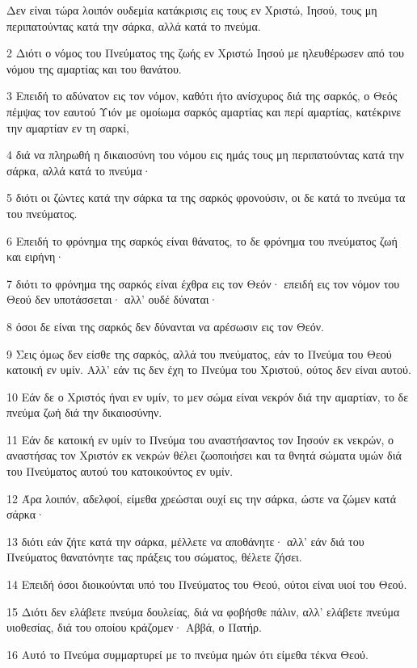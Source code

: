 \par Δεν είναι τώρα λοιπόν ουδεμία κατάκρισις εις τους εν Χριστώ, Ιησού, τους μη περιπατούντας κατά την σάρκα, αλλά κατά το πνεύμα.
\par 2 Διότι ο νόμος του Πνεύματος της ζωής εν Χριστώ Ιησού με ηλευθέρωσεν από του νόμου της αμαρτίας και του θανάτου.
\par 3 Επειδή το αδύνατον εις τον νόμον, καθότι ήτο ανίσχυρος διά της σαρκός, ο Θεός πέμψας τον εαυτού Υιόν με ομοίωμα σαρκός αμαρτίας και περί αμαρτίας, κατέκρινε την αμαρτίαν εν τη σαρκί,
\par 4 διά να πληρωθή η δικαιοσύνη του νόμου εις ημάς τους μη περιπατούντας κατά την σάρκα, αλλά κατά το πνεύμα·
\par 5 διότι οι ζώντες κατά την σάρκα τα της σαρκός φρονούσιν, οι δε κατά το πνεύμα τα του πνεύματος.
\par 6 Επειδή το φρόνημα της σαρκός είναι θάνατος, το δε φρόνημα του πνεύματος ζωή και ειρήνη·
\par 7 διότι το φρόνημα της σαρκός είναι έχθρα εις τον Θεόν· επειδή εις τον νόμον του Θεού δεν υποτάσσεται· αλλ' ουδέ δύναται·
\par 8 όσοι δε είναι της σαρκός δεν δύνανται να αρέσωσιν εις τον Θεόν.
\par 9 Σεις όμως δεν είσθε της σαρκός, αλλά του πνεύματος, εάν το Πνεύμα του Θεού κατοική εν υμίν. Αλλ' εάν τις δεν έχη το Πνεύμα του Χριστού, ούτος δεν είναι αυτού.
\par 10 Εάν δε ο Χριστός ήναι εν υμίν, το μεν σώμα είναι νεκρόν διά την αμαρτίαν, το δε πνεύμα ζωή διά την δικαιοσύνην.
\par 11 Εάν δε κατοική εν υμίν το Πνεύμα του αναστήσαντος τον Ιησούν εκ νεκρών, ο αναστήσας τον Χριστόν εκ νεκρών θέλει ζωοποιήσει και τα θνητά σώματα υμών διά του Πνεύματος αυτού του κατοικούντος εν υμίν.
\par 12 Άρα λοιπόν, αδελφοί, είμεθα χρεώσται ουχί εις την σάρκα, ώστε να ζώμεν κατά σάρκα·
\par 13 διότι εάν ζήτε κατά την σάρκα, μέλλετε να αποθάνητε· αλλ' εάν διά του Πνεύματος θανατόνητε τας πράξεις του σώματος, θέλετε ζήσει.
\par 14 Επειδή όσοι διοικούνται υπό του Πνεύματος του Θεού, ούτοι είναι υιοί του Θεού.
\par 15 Διότι δεν ελάβετε πνεύμα δουλείας, διά να φοβήσθε πάλιν, αλλ' ελάβετε πνεύμα υιοθεσίας, διά του οποίου κράζομεν· Αββά, ο Πατήρ.
\par 16 Αυτό το Πνεύμα συμμαρτυρεί με το πνεύμα ημών ότι είμεθα τέκνα Θεού.
